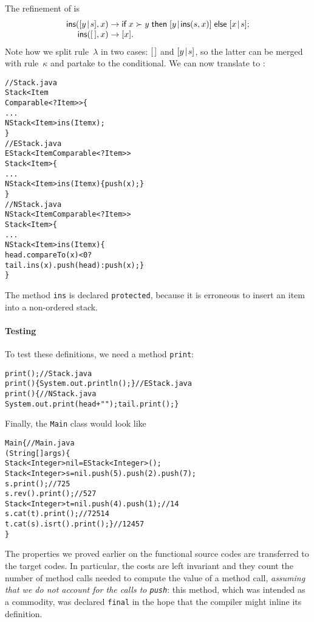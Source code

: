 The refinement of  is
\begin{equation*}
\begin{array}{@{}r@{\;}l@{\;}l@{}}
\fun{ins}(\cons{y}{s},x) & \rightarrow & \fun{if} \; x \succ y \;
\fun{then} \; \cons{y}{\fun{ins}(s,x)} \; \fun{else} \; \cons{x}{s};\\
\fun{ins}(\el,x) & \rightarrow & [x].
\end{array}
\end{equation*}
Note how we split rule~\(\lambda\) in two cases: \([\,]\) and
\([{y}\!\mid\!{s}]\), so the latter can be merged with rule~\(\kappa\) and
partake to the conditional. We can now translate to \Java:
\begin{alltt}
// Stack.java
\public \abstractX \class Stack<Item
\hfill\extends Comparable<? \super Item>> \{
  ...
  \protectedX \abstractX NStack<Item> ins(\final Item x);
\}
// EStack.java
\public \class EStack<Item \extends Comparable<? \super Item>> 
       \extends Stack<Item> \{
  ...
  \protectedX NStack<Item> ins(\final Item x) \{\return push(x);\}
\}
// NStack.java
\public \class NStack<Item \extends Comparable<? \super Item>>
       \extends Stack<Item> \{
  ...
  \protectedX NStack<Item> ins(\final Item x) \{
    \return head.compareTo(x) < 0 ? 
           tail.ins(x).push(head) : push(x); \}
\}
\end{alltt}
The method \texttt{ins} is declared \texttt{protected}, because it is
erroneous to insert an item into a non\hyp{}ordered stack.

\paragraph{Testing}

To test these definitions, we need a method \texttt{print}:
\begin{alltt}
\public \abstractX \void print();\hfill// Stack.java
\public \void print() \{ System.out.println(); \}\hfill// EStack.java
\public \void print() \{\hfill// NStack.java
  System.out.print(head + " "); tail.print(); \}
\end{alltt}
Finally, the \texttt{Main} class would look like
\begin{alltt}
\public \class Main \{\hfill // Main.java
  \public \static \void \main (String[] args) \{
    Stack<Integer> nil = \new EStack<Integer>();
    Stack<Integer> s = nil.push(5).push(2).push(7);
    s.print();\hfill// 7 2 5
    s.rev().print();\hfill// 5 2 7
    Stack<Integer> t = nil.push(4).push(1);\hfill// 1 4
    s.cat(t).print();\hfill// 7 2 5 1 4
    t.cat(s).isrt().print(); \}\hfill// 1 2 4 5 7
\}
\end{alltt}
The properties we proved earlier on the functional source codes are
transferred to the \Java target codes. In particular, the costs are
left invariant and they count the number of method calls needed to
compute the value of a method call, \emph{assuming that we do not
  account for the calls to \texttt{push}}: this method, which was
intended as a commodity, was declared \texttt{final} in the hope that
the compiler might inline its definition.  

